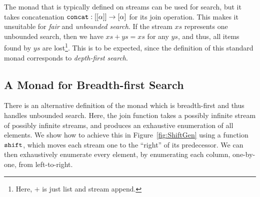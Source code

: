 The monad that is typically defined on streams can be used for search, but it takes concatenation $\texttt{concat} : [[\alpha]] \rightarrow [\alpha]$ for its join operation. This makes it unsuitable for \emph{fair} and \emph{unbounded search}. If the stream $xs$ represents one unbounded search, then we have $xs + ys = xs$ for any $ys$, and thus, all items found by $ys$ are lost\footnote{Here, $+$ is just list and stream append.}. This is to be expected, since the definition of this standard monad corresponds to \emph{depth-first search}. 

\subsection{A Monad for Breadth-first Search}\label{sec:StreamMonad}
There is an alternative definition of the monad which is breadth-first and thus handles unbounded search. Here, the join function takes a possibly infinite stream of possibly infinite streams, and produces an exhaustive enumeration of all elements. We show how to achieve this in Figure~\ref{fig:ShiftGen} using a function $\texttt{shift}$, which moves each stream one to the ``right'' of its predecessor. We can then exhaustively enumerate every element, by enumerating each column, one-by-one, from left-to-right. 

